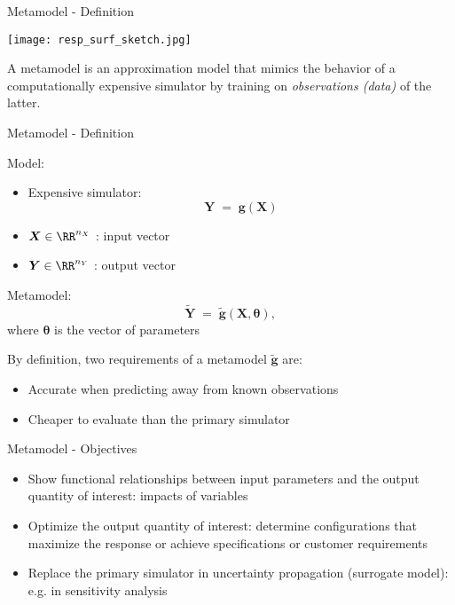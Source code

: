 \documentclass{beamer}
\begin{document}
\begin{frame}[t]{Metamodel - Definition}

\begin{center}
 \texttt{[image: resp\_surf\_sketch.jpg]}
\end{center}

A metamodel is an approximation model that mimics the behavior of a computationally expensive simulator by training on \emph{observations (data)} of the latter.

\end{frame}

\begin{frame}[t]{Metamodel - Definition}

Model:
\begin{itemize}
\item Expensive simulator: 
$$
\boldsymbol{Y} \; = \; \boldsymbol{g}(\boldsymbol{X})
$$
\item $\boldsymbol{X} \in\RR^{n_X}$ : input vector
\item $\boldsymbol{Y}\in\RR^{n_Y}$ : output vector
\end{itemize}
   
Metamodel: 
$$ 
\widetilde{\boldsymbol{Y} } \; 
= \; \tilde{\boldsymbol{g}}(\boldsymbol{X}, \boldsymbol{\theta}), 
$$
where $\boldsymbol{\theta}$ is the vector of parameters

By definition, two requirements of a metamodel $\tilde{\boldsymbol{g}}$ are:
\begin{itemize}
\item Accurate when predicting away from known observations
\item Cheaper to evaluate than the primary simulator
\end{itemize}

\end{frame}


\begin{frame}[t]{Metamodel - Objectives}

\begin{itemize}
\item Show functional relationships between input parameters and the output quantity of interest: impacts of variables 
\item Optimize the output quantity of interest: determine configurations that maximize the response or achieve specifications or customer requirements
\item Replace the primary simulator in uncertainty propagation 
(surrogate model):  e.g. in sensitivity analysis
\end{itemize}

\end{frame}
\end{document}
